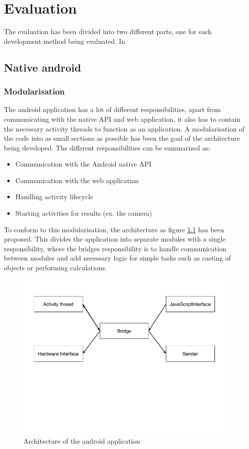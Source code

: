 
\chapter{Evaluation}
The evaluation has been divided into two different parts, one for each development method being evaluated. In 
\section{Native android} \label{android}
\subsection{Modularisation}
The android application has a lot of different responsibilities, apart from communicating with the native API and web application, it also has to contain the necessary activity threads to function as an application. A modularisation of the code into as small sections as possible has been the goal of the architecture being developed. The different responsibilities can be summarized as:

\begin{itemize}
\item Communication with the Android native API
\item Communication with the web application
\item Handling activity lifecycle
\item Starting activities for results (ex. the camera)
\end{itemize}


To conform to this modularisation, the architecture as figure \ref{caption-android-architecture} has been proposed. This divides the application into separate modules with a single responsibility, where the bridges responsibility is to handle communication between modules and add necessary logic for simple tasks such as casting of objects or performing calculations. 


\begin{figure}[ht!]
    \centering
    \includegraphics[width=120mm,natwidth=800,natheight=600]{./img/androidStructure.png}
    \caption{Architecture of the android application\label{caption-android-architecture}}
\end{figure}


